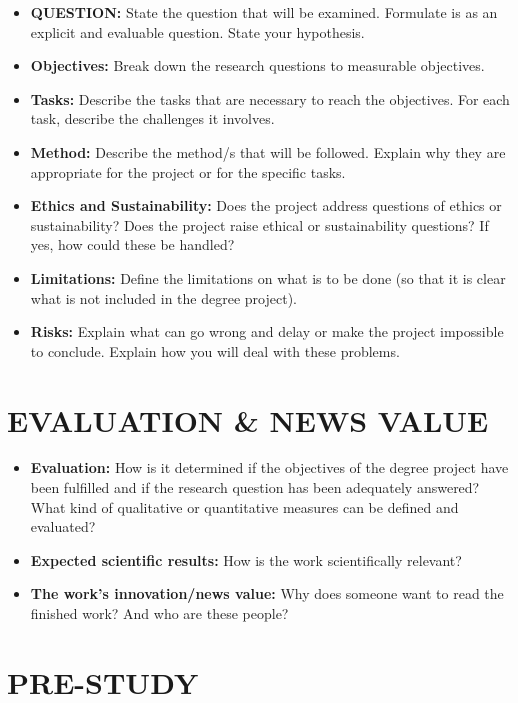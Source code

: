 \documentclass[11pt]{article}
\begin{document}
\begin{itemize}[leftmargin=*, label={}]
  \item \textbf{QUESTION:} State the question that will be examined. Formulate is as an explicit and evaluable question. State your hypothesis.
  \item \textbf{Objectives:} Break down the research questions to measurable objectives.
  \item \textbf{Tasks:} Describe the tasks that are necessary to reach the objectives. For each task, describe the challenges it involves.
  \item \textbf{Method:} Describe the method/s that will be followed. Explain why they are appropriate for the project or for the specific tasks.
  \item \textbf{Ethics and Sustainability:} Does the project address questions of ethics or sustainability? Does the project raise ethical or sustainability questions? If yes, how could these be handled?
  \item \textbf{Limitations:} Define the limitations on what is to be done (so that it is clear what is not included in the degree project).
  \item \textbf{Risks:} Explain what can go wrong and delay or make the project impossible to conclude. Explain how you will deal with these problems.
\end{itemize}

\section*{EVALUATION \& NEWS VALUE}

\begin{itemize}[leftmargin=*, label={}]
  \item \textbf{Evaluation:} How is it determined if the objectives of the degree project have been fulfilled and if the research question has been adequately answered? What kind of qualitative or quantitative measures can be defined and evaluated?
  \item \textbf{Expected scientific results:} How is the work scientifically relevant?
  \item \textbf{The work's innovation/news value:} Why does someone want to read the finished work? And who are these people?
\end{itemize}

\section*{PRE-STUDY}
\end{document}
